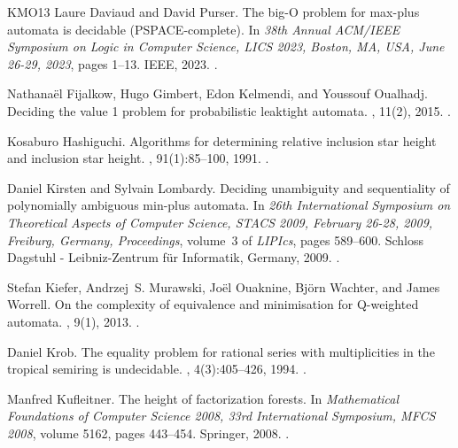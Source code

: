 \documentclass[10pt,a4paper]{amsart}
\theoremstyle{definition}
\numberwithin{equation}{section}
\theoremstyle{remark}
\theoremstyle{remark}
\begin{document}
\begin{thebibliography}{KMO{\etalchar{+}}13}
Laure Daviaud and David Purser.
\newblock The big-{O} problem for max-plus automata is decidable
  ({PSPACE}-complete).
\newblock In {\em 38th Annual {ACM/IEEE} Symposium on Logic in Computer
  Science, {LICS} 2023, Boston, MA, USA, June 26-29, 2023}, pages 1--13.
  {IEEE}, 2023.
\newblock \href {https://doi.org/10.1109/LICS56636.2023.10175798}
  {}.

Nathana{\"{e}}l Fijalkow, Hugo Gimbert, Edon Kelmendi, and Youssouf Oualhadj.
\newblock Deciding the value 1 problem for probabilistic leaktight automata.
, 11(2), 2015.
\newblock \href {https://doi.org/10.2168/LMCS-11(2:12)2015}
  {}.

Kosaburo Hashiguchi.
\newblock Algorithms for determining relative inclusion star height and
  inclusion star height.
, 91(1):85--100, 1991.
\newblock \href {https://doi.org/10.1016/0304-3975(91)90269-8}
  {}.

Daniel Kirsten and Sylvain Lombardy.
\newblock Deciding unambiguity and sequentiality of polynomially ambiguous
  min-plus automata.
\newblock In {\em 26th International Symposium on Theoretical Aspects of
  Computer Science, {STACS} 2009, February 26-28, 2009, Freiburg, Germany,
  Proceedings}, volume~3 of {\em LIPIcs}, pages 589--600. Schloss Dagstuhl -
  Leibniz-Zentrum f{\"{u}}r Informatik, Germany, 2009.
\newblock \href {https://doi.org/10.4230/LIPIcs.STACS.2009.1850}
  {}.

Stefan Kiefer, Andrzej~S. Murawski, Jo{\"{e}}l Ouaknine, Bj{\"{o}}rn Wachter,
  and James Worrell.
\newblock On the complexity of equivalence and minimisation for {Q}-weighted
  automata.
, 9(1), 2013.
\newblock \href {https://doi.org/10.2168/LMCS-9(1:8)2013}
  {}.

Daniel Krob.
\newblock The equality problem for rational series with multiplicities in the
  tropical semiring is undecidable.
, 4(3):405--426, 1994.
\newblock \href {https://doi.org/10.1142/S0218196794000063}
  {}.

Manfred Kufleitner.
\newblock The height of factorization forests.
\newblock In {\em Mathematical Foundations of Computer Science 2008, 33rd
  International Symposium, {MFCS} 2008}, volume 5162, pages 443--454. Springer,
  2008.
\newblock \href {https://doi.org/10.1007/978-3-540-85238-4_36}
  {}.


\end{thebibliography}
\end{document}
